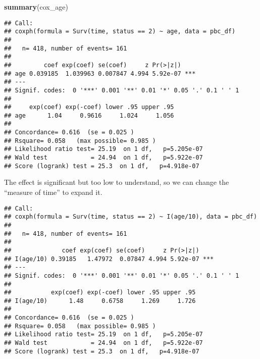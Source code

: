\documentclass[]{book}
\newenvironment{Shaded}{\begin{snugshade}}{\end{snugshade}}
\newcommand{\KeywordTok}[1]{\textcolor[rgb]{0.13,0.29,0.53}{\textbf{{#1}}}}
\newcommand{\DataTypeTok}[1]{\textcolor[rgb]{0.13,0.29,0.53}{{#1}}}
\newcommand{\DecValTok}[1]{\textcolor[rgb]{0.00,0.00,0.81}{{#1}}}
\newcommand{\StringTok}[1]{\textcolor[rgb]{0.31,0.60,0.02}{{#1}}}
\newcommand{\CommentTok}[1]{\textcolor[rgb]{0.56,0.35,0.01}{\textit{{#1}}}}
\newcommand{\NormalTok}[1]{{#1}}
\theoremstyle{definition}
\theoremstyle{definition}
\theoremstyle{definition}
\theoremstyle{remark}
\begin{document}
\begin{Shaded}
\begin{Highlighting}[]
\KeywordTok{summary}\NormalTok{(cox_age)}
\end{Highlighting}
\end{Shaded}

\begin{verbatim}
## Call:
## coxph(formula = Surv(time, status == 2) ~ age, data = pbc_df)
## 
##   n= 418, number of events= 161 
## 
##         coef exp(coef) se(coef)     z Pr(>|z|)    
## age 0.039185  1.039963 0.007847 4.994 5.92e-07 ***
## ---
## Signif. codes:  0 '***' 0.001 '**' 0.01 '*' 0.05 '.' 0.1 ' ' 1
## 
##     exp(coef) exp(-coef) lower .95 upper .95
## age      1.04     0.9616     1.024     1.056
## 
## Concordance= 0.616  (se = 0.025 )
## Rsquare= 0.058   (max possible= 0.985 )
## Likelihood ratio test= 25.19  on 1 df,   p=5.205e-07
## Wald test            = 24.94  on 1 df,   p=5.922e-07
## Score (logrank) test = 25.3  on 1 df,   p=4.918e-07
\end{verbatim}

The effect is significant but too low to understand, so we can change
the ``measure of time'' to expand it.

\begin{Shaded}
\end{Shaded}

\begin{verbatim}
## Call:
## coxph(formula = Surv(time, status == 2) ~ I(age/10), data = pbc_df)
## 
##   n= 418, number of events= 161 
## 
##              coef exp(coef) se(coef)     z Pr(>|z|)    
## I(age/10) 0.39185   1.47972  0.07847 4.994 5.92e-07 ***
## ---
## Signif. codes:  0 '***' 0.001 '**' 0.01 '*' 0.05 '.' 0.1 ' ' 1
## 
##           exp(coef) exp(-coef) lower .95 upper .95
## I(age/10)      1.48     0.6758     1.269     1.726
## 
## Concordance= 0.616  (se = 0.025 )
## Rsquare= 0.058   (max possible= 0.985 )
## Likelihood ratio test= 25.19  on 1 df,   p=5.205e-07
## Wald test            = 24.94  on 1 df,   p=5.922e-07
## Score (logrank) test = 25.3  on 1 df,   p=4.918e-07
\end{verbatim}
\end{document}
